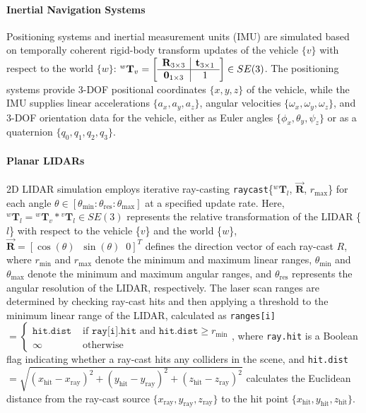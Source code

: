 \paragraph{Inertial Navigation Systems}
\label{Inertial Navigation Systems}

Positioning systems and inertial measurement units (IMU) are simulated based on temporally coherent rigid-body transform updates of the vehicle $\{v\}$ with respect to the world $\{w\}$: ${^w\mathbf{T}_v} = \left[\begin{array}{c | c} \mathbf{R}_{3 \times 3} & \mathbf{t}_{3 \times 1} \\ \hline \mathbf{0}_{1 \times 3} & 1 \end{array}\right] \in SE(3)$. The positioning systems provide 3-DOF positional coordinates $\{x,y,z\}$ of the vehicle, while the IMU supplies linear accelerations $\{a_x,a_y,a_z\}$, angular velocities $\{\omega_x,\omega_y,\omega_z\}$, and 3-DOF orientation data for the vehicle, either as Euler angles $\{\phi_x,\theta_y,\psi_z\}$ or as a quaternion $\{q_0,q_1,q_2,q_3\}$.

\paragraph{Planar LIDARs}
\label{Planar LIDARs}

2D LIDAR simulation employs iterative ray-casting \texttt{raycast}\{$^w\mathbf{T}_l$, $\vec{\mathbf{R}}$, $r_{\text{max}}$\} for each angle $\theta \in \left [ \theta_{\text{min}}:\theta_{\text{res}}:\theta_{\text{max}} \right ]$ at a specified update rate. Here, ${^w\mathbf{T}_l} = {^w\mathbf{T}_v} * {^v\mathbf{T}_l} \in SE(3)$ represents the relative transformation of the LIDAR \{$l$\} with respect to the vehicle \{$v$\} and the world \{$w$\}, $\vec{\mathbf{R}} = \left [\cos(\theta) \;\; \sin(\theta) \;\; 0 \right ]^T$ defines the direction vector of each ray-cast $R$, where $r_{\text{min}}$ and $r_{\text{max}}$ denote the minimum and maximum linear ranges, $\theta_{\text{min}}$ and $\theta_{\text{max}}$ denote the minimum and maximum angular ranges, and $\theta_{\text{res}}$ represents the angular resolution of the LIDAR, respectively. The laser scan ranges are determined by checking ray-cast hits and then applying a threshold to the minimum linear range of the LIDAR, calculated as \texttt{ranges[i]}$=\begin{cases} \texttt{hit.dist} & \text{ if } \texttt{ray[i].hit} \text{ and } \texttt{hit.dist} \geq r_{\text{min}} \\ \infty & \text{ otherwise} \end{cases}$, where \texttt{ray.hit} is a Boolean flag indicating whether a ray-cast hits any colliders in the scene, and \texttt{hit.dist}$=\sqrt{(x_{\text{hit}}-x_{\text{ray}})^2 + (y_{\text{hit}}-y_{\text{ray}})^2 + (z_{\text{hit}}-z_{\text{ray}})^2}$ calculates the Euclidean distance from the ray-cast source $\{x_{\text{ray}}, y_{\text{ray}}, z_{\text{ray}}\}$ to the hit point $\{x_{\text{hit}}, y_{\text{hit}}, z_{\text{hit}}\}$.

